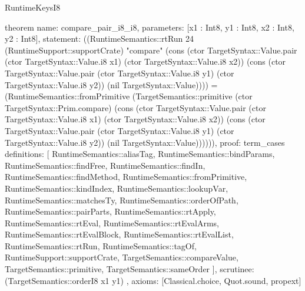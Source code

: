 \begin{lexlean}{RuntimeKeysI8}
\begin{semanticmodule}
theorem{
  name: compare_pair_i8_i8,
  parameters: [x1 : Int8, y1 : Int8, x2 : Int8, y2 : Int8],
  statement: ((RuntimeSemantics::rtRun 24 (RuntimeSupport::supportCrate) "compare" (cons (ctor TargetSyntax::Value.pair (ctor TargetSyntax::Value.i8 x1) (ctor TargetSyntax::Value.i8 x2)) (cons (ctor TargetSyntax::Value.pair (ctor TargetSyntax::Value.i8 y1) (ctor TargetSyntax::Value.i8 y2)) (nil TargetSyntax::Value)))) = (RuntimeSemantics::fromPrimitive (TargetSemantics::primitive (ctor TargetSyntax::Prim.compare) (cons (ctor TargetSyntax::Value.pair (ctor TargetSyntax::Value.i8 x1) (ctor TargetSyntax::Value.i8 x2)) (cons (ctor TargetSyntax::Value.pair (ctor TargetSyntax::Value.i8 y1) (ctor TargetSyntax::Value.i8 y2)) (nil TargetSyntax::Value)))))),
  proof: term_cases{
    definitions: [
      RuntimeSemantics::aliasTag,
      RuntimeSemantics::bindParams,
      RuntimeSemantics::findFree,
      RuntimeSemantics::findIn,
      RuntimeSemantics::findMethod,
      RuntimeSemantics::fromPrimitive,
      RuntimeSemantics::kindIndex,
      RuntimeSemantics::lookupVar,
      RuntimeSemantics::matchesTy,
      RuntimeSemantics::orderOfPath,
      RuntimeSemantics::pairParts,
      RuntimeSemantics::rtApply,
      RuntimeSemantics::rtEval,
      RuntimeSemantics::rtEvalArms,
      RuntimeSemantics::rtEvalBlock,
      RuntimeSemantics::rtEvalList,
      RuntimeSemantics::rtRun,
      RuntimeSemantics::tagOf,
      RuntimeSupport::supportCrate,
      TargetSemantics::compareValue,
      TargetSemantics::primitive,
      TargetSemantics::sameOrder
    ],
    scrutinee: (TargetSemantics::orderI8 x1 y1)
  },
  axioms: [Classical.choice, Quot.sound, propext]
}


\end{semanticmodule}
\end{lexlean}

